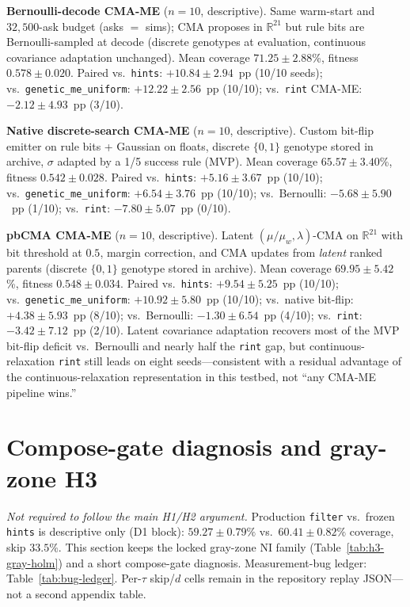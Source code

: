 \textbf{Bernoulli-decode CMA-ME} ($n{=}10$, descriptive). Same warm-start and $32{,}500$-ask budget (asks $=$ sims); CMA proposes in $\mathbb{R}^{21}$ but rule bits are Bernoulli-sampled at decode (discrete genotypes at evaluation, continuous covariance adaptation unchanged). Mean coverage $71.25 \pm 2.88$\%, fitness $0.578 \pm 0.020$. Paired vs.\ \texttt{hints}: $+10.84 \pm 2.94$~pp (10/10 seeds); vs.\ \texttt{genetic\_me\_uniform}: $+12.22 \pm 2.56$~pp (10/10); vs.\ \texttt{rint} CMA-ME: $-2.12 \pm 4.93$~pp (3/10).

\textbf{Native discrete-search CMA-ME} ($n{=}10$, descriptive). Custom bit-flip emitter on rule bits + Gaussian on floats, discrete $\{0,1\}$ genotype stored in archive, $\sigma$ adapted by a 1/5 success rule (MVP). Mean coverage $65.57 \pm 3.40$\%, fitness $0.542 \pm 0.028$. Paired vs.\ \texttt{hints}: $+5.16 \pm 3.67$~pp (10/10); vs.\ \texttt{genetic\_me\_uniform}: $+6.54 \pm 3.76$~pp (10/10); vs.\ Bernoulli: $-5.68 \pm 5.90$~pp (1/10); vs.\ \texttt{rint}: $-7.80 \pm 5.07$~pp (0/10).

\textbf{pbCMA CMA-ME} ($n{=}10$, descriptive). Latent $(\mu/\mu_w,\lambda)$-CMA on $\mathbb{R}^{21}$ with bit threshold at $0.5$, margin correction, and CMA updates from \emph{latent} ranked parents (discrete $\{0,1\}$ genotype stored in archive). Mean coverage $69.95 \pm 5.42$\%, fitness $0.548 \pm 0.034$. Paired vs.\ \texttt{hints}: $+9.54 \pm 5.25$~pp (10/10); vs.\ \texttt{genetic\_me\_uniform}: $+10.92 \pm 5.80$~pp (10/10); vs.\ native bit-flip: $+4.38 \pm 5.93$~pp (8/10); vs.\ Bernoulli: $-1.30 \pm 6.54$~pp (4/10); vs.\ \texttt{rint}: $-3.42 \pm 7.12$~pp (2/10). Latent covariance adaptation recovers most of the MVP bit-flip deficit vs.\ Bernoulli and nearly half the \texttt{rint} gap, but continuous-relaxation \texttt{rint} still leads on eight seeds---consistent with a residual advantage of the continuous-relaxation representation in this testbed, not ``any CMA-ME pipeline wins.''

\section{Compose-gate diagnosis and gray-zone H3}
\label{sec:h3-appendix}

\emph{Not required to follow the main H1/H2 argument.} Production \texttt{filter} vs.\ frozen \texttt{hints} is descriptive only (D1 block): $59.27\pm0.79\%$ vs.\ $60.41\pm0.82\%$ coverage, skip $33.5\%$. This section keeps the locked gray-zone NI family (Table~\ref{tab:h3-gray-holm}) and a short compose-gate diagnosis. Measurement-bug ledger: Table~\ref{tab:bug-ledger}. Per-$\tau$ skip/$d$ cells remain in the repository replay JSON---not a second appendix table.

